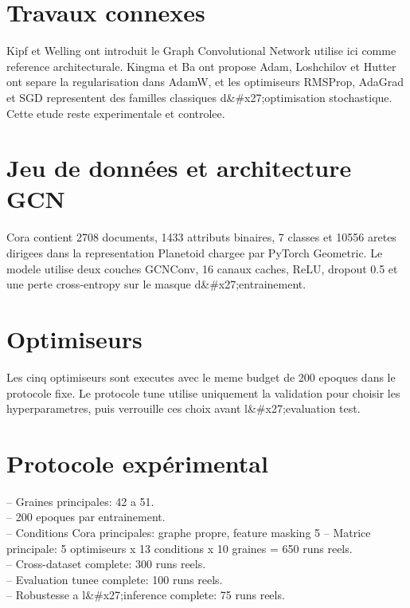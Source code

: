 \documentclass[11pt,a4paper]{article}
\begin{document}
\section{Travaux connexes}
\par
Kipf et Welling ont introduit le Graph Convolutional Network utilise ici comme reference architecturale. Kingma et Ba ont propose Adam, Loshchilov et Hutter ont separe la regularisation dans AdamW, et les optimiseurs RMSProp, AdaGrad et SGD representent des familles classiques d&#x27;optimisation stochastique. Cette etude reste experimentale et controlee.
\par
\section{Jeu de données et architecture GCN}
\par
Cora contient 2708 documents, 1433 attributs binaires, 7 classes et 10556 aretes dirigees dans la representation Planetoid chargee par PyTorch Geometric. Le modele utilise deux couches GCNConv, 16 canaux caches, ReLU, dropout 0.5 et une perte cross-entropy sur le masque d&#x27;entrainement.
\par
\section{Optimiseurs}
\par
Les cinq optimiseurs sont executes avec le meme budget de 200 epoques dans le protocole fixe. Le protocole tune utilise uniquement la validation pour choisir les hyperparametres, puis verrouille ces choix avant l&#x27;evaluation test.
\par
\section{Protocole expérimental}
\par
\noindent-- Graines principales: 42 a 51.\\
\noindent-- 200 epoques par entrainement.\\
\noindent-- Conditions Cora principales: graphe propre, feature masking 5%
\noindent-- Matrice principale: 5 optimiseurs x 13 conditions x 10 graines = 650 runs reels.\\
\noindent-- Cross-dataset complete: 300 runs reels.\\
\noindent-- Evaluation tunee complete: 100 runs reels.\\
\noindent-- Robustesse a l&#x27;inference complete: 75 runs reels.\\
\par
\end{document}

